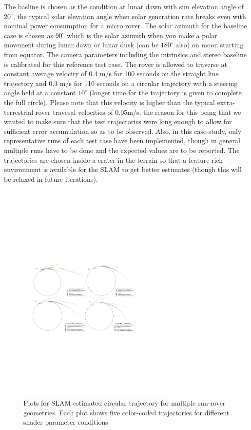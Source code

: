 \documentclass[a4paper, 10pt, conference]{ieeeconf}      %
\begin{document}
The basline is chosen as the condition at lunar dawn with sun elevation angle of $20^\circ$, the typical solar elevation angle when solar generation rate breaks even with nominal power consumption for a micro rover. The solar azimuth for the baseline case is chosen as $90^\circ$ which is the solar azimuth when you make a polar movement during lunar dawn or lunar dusk (can be $180^\circ$ also) on moon starting from equator. The camera parameters including the intrinsics and stereo baseline is calibrated for this reference test case. The rover is allowed to traverse at constant average velocity of 0.4 m/s for 100 seconds on the straight line trajectory and 0.3 m/s for 110 seconds on a circular trajectory with a steering angle held at a constant $10^\circ$ (longer time for the trajectory is given to complete the full circle). Please note that this velocity is higher than the typical extra-terrestrial rover travesal velocities of 0.05m/s, the reason for this being that we wanted to make sure that the test trajectories were long enough to allow for sufficient error accumulation so as to be observed. Also, in this case-study, only representative runs of each test case have been implemented, though in general multiple runs have to be done and the expected values are to be reported. The trajectories are chosen inside a crater in the terrain so that a feature rich environment is available for the SLAM to get better estimates (though this will be relaxed in future iterations).
\begin{figure}[!htb]
      \centering
        \includegraphics[width=0.7\textwidth]{Figures/circle_plots.pdf}
      \caption{Plots for SLAM estimated circular trajectory for multiple sun-rover geometries. Each plot shows five color-coded trajectories for different shader parameter conditions}
      \label{circle_plots}
\end{figure}
\end{document}
